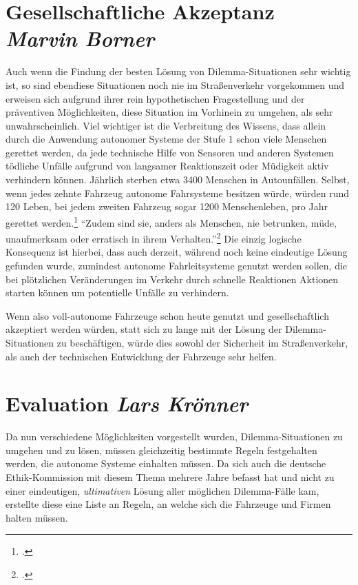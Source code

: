 \documentclass[a4paper, 12pt, openany]{book}
\newcommand\Section[2]{\section[#1 {\scriptsize\itshape#2}]{#1 \footnotesize\itshape#2}}
\begin{document}
        \Section{Gesellschaftliche Akzeptanz}{Marvin Borner}
            Auch wenn die Findung der besten Lösung von Dilemma-Situationen sehr wichtig ist, so sind ebendiese Situationen noch nie im Straßenverkehr vorgekommen und erweisen sich aufgrund ihrer rein hypothetischen Fragestellung und der präventiven Möglichkeiten, diese Situation im Vorhinein zu umgehen, als sehr unwahrscheinlich. Viel wichtiger ist die Verbreitung des Wissens, dass allein durch die Anwendung autonomer Systeme der Stufe 1 schon viele Menschen gerettet werden, da jede technische Hilfe von Sensoren und anderen Systemen tödliche Unfälle aufgrund von langsamer Reaktionszeit oder Müdigkeit aktiv verhindern können. Jährlich sterben etwa 3400 Menschen in Autounfällen. Selbst, wenn jedes zehnte Fahrzeug autonome Fahrsysteme besitzen würde, würden rund 120 Leben, bei jedem zweiten Fahrzeug sogar 1200 Menschenleben, pro Jahr gerettet werden.\footcite[353]{thierer2014roadblocks} \enquote{Zudem sind sie, anders als Menschen, nie betrunken, müde, unaufmerksam oder erratisch in ihrem Verhalten.}\footcite[228]{scholz2016autonomes} Die einzig logische Konsequenz ist hierbei, dass auch derzeit, während noch keine eindeutige Lösung gefunden wurde, zumindest autonome Fahrleitsysteme genutzt werden sollen, die bei plötzlichen Veränderungen im Verkehr durch schnelle Reaktionen Aktionen starten können um potentielle Unfälle zu verhindern.\par
            Wenn also voll-autonome Fahrzeuge schon heute genutzt und gesellschaftlich akzeptiert werden würden, statt sich zu lange mit der Lösung der Dilemma-Situationen zu beschäftigen, würde dies sowohl der Sicherheit im Straßenverkehr, als auch der technischen Entwicklung der Fahrzeuge sehr helfen.
            
        
        \Section{Evaluation}{Lars Krönner}\label{eval}
            Da nun verschiedene Möglichkeiten vorgestellt wurden, Dilemma-Situationen zu umgehen und zu lösen, müssen gleichzeitig bestimmte Regeln festgehalten werden, die autonome Systeme einhalten müssen. Da sich auch die deutsche Ethik-Kommission mit diesem Thema mehrere Jahre befasst hat und nicht zu einer eindeutigen, \textit{ultimativen} Lösung aller möglichen Dilemma-Fälle kam, erstellte diese eine Liste an Regeln, an welche sich die Fahrzeuge und Firmen halten müssen.
            
\end{document}
